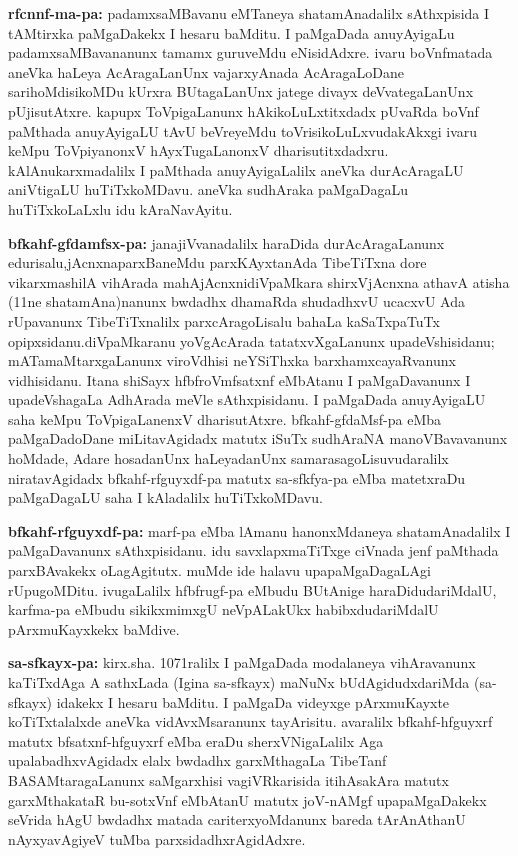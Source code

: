 {\bf rfcnnf-ma-pa:} padamxsaMBavanu eMTaneya shatamAnadalilx sAthxpisida I tAMtirxka paMgaDakekx I hesaru baMditu. I paMgaDada anuyAyigaLu padamxsaMBavananunx tamamx guruveMdu eNisidAdxre. ivaru boVnfmatada aneVka haLeya AcAragaLanUnx vajarxyAnada AcAragaLoDane sarihoMdisikoMDu kUrxra BUtagaLanUnx jatege divayx deVvategaLanUnx pUjisutAtxre. kapupx ToVpigaLanunx hAkikoLuLxtitxdadx pUvaRda boVnf paMthada anuyAyigaLU tAvU beVreyeMdu toVrisikoLuLxvudakAkxgi ivaru keMpu ToVpiyanonxV hAyxTugaLanonxV dharisutitxdadxru. kAlAnukarxmadalilx I paMthada anuyAyigaLalilx aneVka durAcAragaLU aniVtigaLU huTiTxkoMDavu. aneVka sudhAraka paMgaDagaLu huTiTxkoLaLxlu idu kAraNavAyitu.

{\bf bfkahf-gfdamfsx-pa:} janajiVvanadalilx haraDida durAcAragaLanunx edurisalu,\break jAcnxnaparxBaneMdu parxKAyxtanAda TibeTiTxna dore vikarxmashilA vihArada mahAjAcnxni\break diVpaMkara shirxVjAcnxna athavA atisha (11ne shatamAna)nanunx bwdadhx dhamaRda \hbox{shudadhxvU} ucacxvU Ada rUpavanunx TibeTiTxnalilx parxcAragoLisalu bahaLa kaSaTxpaTuTx opipxsidanu.\break diVpaMkaranu yoVgAcArada tatatxvXgaLanunx upadeVshisidanu; mATamaMtarxgaLanunx viroV\-dhisi neYSiThxka barxhamxcayaRvanunx vidhisidanu. Itana shiSayx hfbfroVmfsatxnf eMbA\-tanu I paMgaDavanunx I upadeVshagaLa AdhArada meVle sAthxpisidanu. I paMgaDada anuyAyigaLU saha keMpu ToVpigaLanenxV dharisutAtxre. bfkahf-gfdaMsf-pa eMba paMgaDadoDane miLitavAgidadx matutx iSuTx sudhAraNA manoVBavavanunx hoMdade, Adare hosadanUnx haLeyadanUnx samarasagoLisuvudaralilx niratavAgidadx bfkahf-rfguyxdf-pa matutx sa-sfkfya-pa eMba matetxraDu paMgaDagaLU saha I kAladalilx huTiTxkoMDavu.

{\bf bfkahf-rfguyxdf-pa:} marf-pa eMba lAmanu hanonxMdaneya shatamAnadalilx I paMgaDavanunx sAthxpisidanu. idu savxlapxmaTiTxge ciVnada jenf paMthada parxBAvakekx oLagAgitutx. muMde ide halavu upapaMgaDagaLAgi rUpugoMDitu. ivugaLalilx hfbfrugf-pa eMbudu BUtAnige haraDidudariMdalU, karfma-pa eMbudu sikikxmimxgU neVpALakUkx habibxdudariMdalU pArxmuKayxkekx baMdive.

{\bf sa-sfkayx-pa:} kirx.sha. 1071ralilx I paMgaDada modalaneya vihAravanunx kaTiTxdAga A sathxLada (Igina sa-sfkayx) maNuNx bUdAgidudxdariMda (sa-sfkayx) idakekx I hesaru baMditu. I paMgaDa videyxge pArxmuKayxte koTiTxtalalxde aneVka vidAvxMsaranunx tayArisitu. avaralilx bfkahf-hfguyxrf matutx bfsatxnf-hfguyxrf eMba eraDu sherxVNigaLalilx Aga upalabadhxvAgidadx elalx bwdadhx garxMthagaLa TibeTanf BASAMtaragaLanunx saMgarxhisi vagiVRkarisida itihAsakAra matutx garxMthakataR bu-sotxVnf eMbAtanU matutx joV-nAMgf upapaMgaDakekx seVrida hAgU bwdadhx matada cariterxyoMdanunx bareda tArAnAthanU nAyxyavAgiyeV tuMba parxsidadhxrAgidAdxre.

